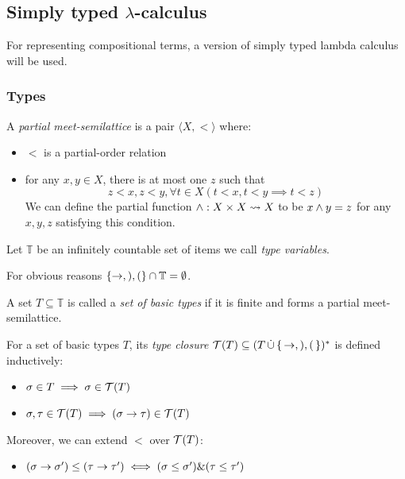 \documentclass[main.tex]{subfiles}
\begin{document}
\subsection{Simply typed $\lambda$-calculus}
\label{sec:lambda}

For representing compositional terms, a version of simply typed lambda calculus
will be used.

\subsubsection{Types}
\begin{defn}
    A \emph{partial meet-semilattice} is a pair $\langle X, \less \rangle$ where:
    \begin{itemize}
        \item $\less$ is a partial-order relation
        \item for any $x, y \in X$, there is at most one $z$ such that
        \[  z \less x, z \less y,
            \forall t \in X (t \less x, t \less y \implies t \less z) \]
        We can define the partial function $\wedge : X \times X \leadsto X$ to
        be $x \wedge y = z$ for any $x, y, z$ satisfying this condition.
    \end{itemize}
\end{defn}

\begin{defn}
    Let $\mathbb{T}$ be an infinitely countable set of items we call
    \emph{type variables}.

    For obvious reasons  $\{ \rightarrow, ), ( \} \cap \mathbb{T} = \emptyset$.
\end{defn}

\begin{defn}
    A set $T \subseteq \mathbb{T}$ is called a \emph{set of basic types}
    if it is finite and forms a partial meet-semilattice.
\end{defn}

\begin{defn}
    For a set of basic types $T$, its \emph{type closure}
    $\mathcal{T}( T ) \subseteq (T \, \dot\cup \,\{\, \rightarrow, ), ( \,\})^*$ is defined
    inductively:

    \begin{itemize}
        \item $\sigma \in T \implies \sigma \in \mathcal{T}( T )$
        \item $\sigma, \tau \in \mathcal{T}( T ) \implies (\sigma \rightarrow \tau) \in \mathcal{T}( T )$
    \end{itemize}

    Moreover, we can extend $\less$ over
    $\mathcal{T}( T )$:
    \begin{itemize}
        \item $(\sigma \rightarrow \sigma') \leq (\tau \rightarrow \tau') \iff (\sigma \leq \sigma')
            \& (\tau \leq \tau')$
    \end{itemize}
\end{defn}
\end{document}
